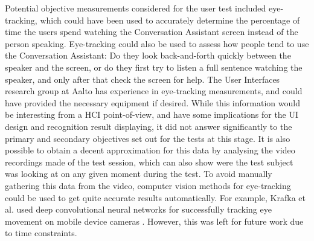 \documentclass[english, 12pt, a4paper, pdftex, elec, utf8]{aaltothesis}
\begin{document}
Potential objective measurements considered for the user test included eye-tracking, which could have been used to accurately determine the percentage of time the users spend watching the Conversation Assistant screen instead of the person speaking. Eye-tracking could also be used to assess how people tend to use the Conversation Assistant: Do they look back-and-forth quickly between the speaker and the screen, or do they first try to listen a full sentence watching the speaker, and only after that check the screen for help. The User Interfaces research group at Aalto has experience in eye-tracking measurements, and could have provided the necessary equipment if desired. While this information would be interesting from a HCI point-of-view, and have some implications for the UI design and recognition result displaying, it did not answer significantly to the primary and secondary objectives set out for the tests at this stage. It is also possible to obtain a decent approximation for this data by analysing the video recordings made of the test session, which can also show were the test subject was looking at on any given moment during the test. To avoid manually gathering this data from the video, computer vision methods for eye-tracking could be used to get quite accurate results automatically. For example, Krafka et al. used deep convolutional neural networks for successfully tracking eye movement on mobile device cameras \cite{krafka2016eye}. However, this was left for future work due to time constraints. \\\\
\end{document}
